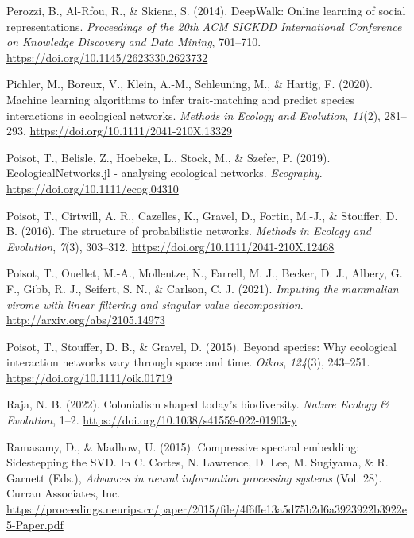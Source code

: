 \documentclass[11pt]{article}
\newlength{\cslhangindent}
\newenvironment{CSLReferences}[2] %
 {%
  \setlength{\parindent}{0pt}
  \ifodd #1 \everypar{\setlength{\hangindent}{\cslhangindent}}\ignorespaces\fi
  \ifnum #2 > 0
  \setlength{\parskip}{#2\baselineskip}
  \fi
 }%
 {}
\begin{document}
\begin{CSLReferences}{1}{0}
\leavevmode{}%
Perozzi, B., Al-Rfou, R., \& Skiena, S. (2014). DeepWalk: Online
learning of social representations. \emph{Proceedings of the 20th ACM
SIGKDD International Conference on Knowledge Discovery and Data Mining},
701--710. \url{https://doi.org/10.1145/2623330.2623732}

\leavevmode{}%
Pichler, M., Boreux, V., Klein, A.-M., Schleuning, M., \& Hartig, F.
(2020). Machine learning algorithms to infer trait-matching and predict
species interactions in ecological networks. \emph{Methods in Ecology
and Evolution}, \emph{11}(2), 281--293.
\url{https://doi.org/10.1111/2041-210X.13329}

\leavevmode{}%
Poisot, T., Belisle, Z., Hoebeke, L., Stock, M., \& Szefer, P. (2019).
EcologicalNetworks.jl - analysing ecological networks. \emph{Ecography}.
\url{https://doi.org/10.1111/ecog.04310}

\leavevmode{}%
Poisot, T., Cirtwill, A. R., Cazelles, K., Gravel, D., Fortin, M.-J., \&
Stouffer, D. B. (2016). The structure of probabilistic networks.
\emph{Methods in Ecology and Evolution}, \emph{7}(3), 303--312.
\url{https://doi.org/10.1111/2041-210X.12468}

\leavevmode{}%
Poisot, T., Ouellet, M.-A., Mollentze, N., Farrell, M. J., Becker, D.
J., Albery, G. F., Gibb, R. J., Seifert, S. N., \& Carlson, C. J.
(2021). \emph{Imputing the mammalian virome with linear filtering and
singular value decomposition}. \url{http://arxiv.org/abs/2105.14973}

\leavevmode{}%
Poisot, T., Stouffer, D. B., \& Gravel, D. (2015). Beyond species: Why
ecological interaction networks vary through space and time.
\emph{Oikos}, \emph{124}(3), 243--251.
\url{https://doi.org/10.1111/oik.01719}

\leavevmode{}%
Raja, N. B. (2022). Colonialism shaped today's biodiversity.
\emph{Nature Ecology \& Evolution}, 1--2.
\url{https://doi.org/10.1038/s41559-022-01903-y}

\leavevmode{}%
Ramasamy, D., \& Madhow, U. (2015). Compressive spectral embedding:
Sidestepping the SVD. In C. Cortes, N. Lawrence, D. Lee, M. Sugiyama, \&
R. Garnett (Eds.), \emph{Advances in neural information processing
systems} (Vol. 28). Curran Associates, Inc.
\url{https://proceedings.neurips.cc/paper/2015/file/4f6ffe13a5d75b2d6a3923922b3922e5-Paper.pdf}


\end{CSLReferences}
\end{document}
